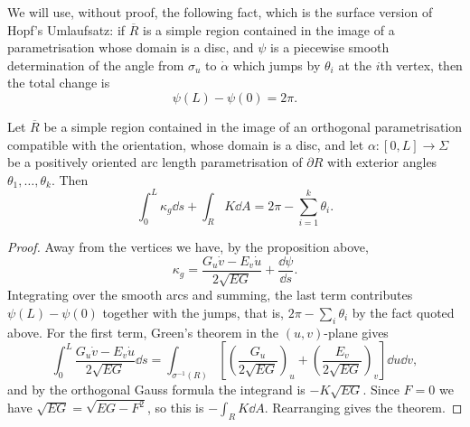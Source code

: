 \documentclass[a4paper]{scrartcl}
\begin{document}
\begin{center}
\end{center}

We will use, without proof, the following fact, which is the surface version of Hopf's Umlaufsatz: if $\overline R$ is a simple region contained in the image of a parametrisation whose domain is a disc, and $\psi$ is a piecewise smooth determination of the angle from $\sigma_u$ to $\dot\alpha$ which jumps by $\theta_i$ at the $i$th vertex, then the total change is
$$
\psi(L) - \psi(0) = 2\pi.
$$

\begin{theorem}
    Let $\overline R$ be a simple region contained in the image of an orthogonal parametrisation compatible with the orientation, whose domain is a disc, and let $\alpha: [0,L] \rightarrow \Sigma$ be a positively oriented arc length parametrisation of $\partial R$ with exterior angles $\theta_1,\dots,\theta_k$. Then
    $$
    \int_0^L \kappa_g \dd s + \int_R K \dd A = 2\pi - \sum_{i=1}^k \theta_i.
    $$
\end{theorem}
\begin{proof}
    Away from the vertices we have, by the proposition above,
    $$
    \kappa_g = \frac{G_u\dot v - E_v\dot u}{2\sqrt{EG}} + \frac{\dd\psi}{\dd s}.
    $$
    Integrating over the smooth arcs and summing, the last term contributes $\psi(L)-\psi(0)$ together with the jumps, that is, $2\pi - \sum_i\theta_i$ by the fact quoted above. For the first term, Green's theorem in the $(u,v)$-plane gives
    $$
    \int_0^L \frac{G_u\dot v - E_v\dot u}{2\sqrt{EG}}\dd s = \int_{\sigma^{-1}(R)}\left[\left(\frac{G_u}{2\sqrt{EG}}\right)_u + \left(\frac{E_v}{2\sqrt{EG}}\right)_v\right]\dd u \dd v,
    $$
    and by the orthogonal Gauss formula the integrand is $-K\sqrt{EG}$. Since $F = 0$ we have $\sqrt{EG} = \sqrt{EG-F^2}$, so this is $-\int_R K \dd A$. Rearranging gives the theorem.
\end{proof}
\end{document}
